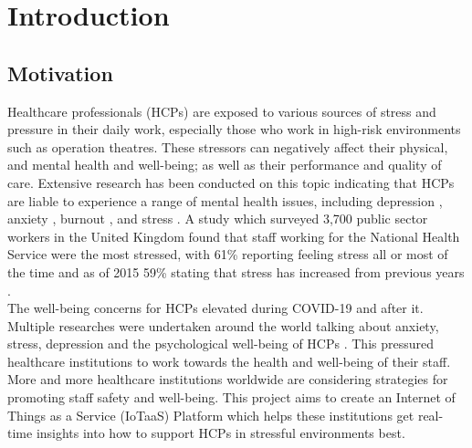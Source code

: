 \chapter{Introduction}

\section{Motivation}
Healthcare professionals (HCPs) are exposed to various sources of stress and pressure in their daily work, especially those who work in high-risk environments such as operation theatres. These stressors can negatively affect their physical, and mental health and well-being; as well as their performance and quality of care. Extensive research has been conducted on this topic indicating that HCPs are liable to experience a range of mental health issues, including depression \cite{ref1}, anxiety \cite{ref2}, burnout \cite{ref3}, and stress \cite{ref4}. A study which surveyed 3,700 public sector workers in the United Kingdom found that staff working for the National Health Service were the most stressed, with 61\% reporting feeling stress all or most of the time and as of 2015 59\% stating that stress has increased from previous years \cite{ref5}.\\

\noindent The well-being concerns for HCPs elevated during COVID-19 and after it. Multiple researches were undertaken around the world talking about anxiety, stress, depression and the psychological well-being of HCPs \cite{ref6}\cite{ref7}. This pressured healthcare institutions to work towards the health and well-being of their staff. More and more healthcare institutions worldwide are considering strategies for promoting staff safety and well-being. This project aims to create an Internet of Things as a Service (IoTaaS) Platform which helps these institutions get real-time insights into how to support HCPs in stressful environments best.




